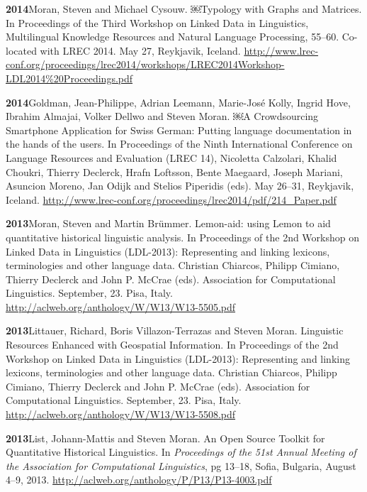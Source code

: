 \documentclass[11pt]{article}
\newcommand{\hangpara}{
 \setlength{\parindent}{0in} %
 \hangindent=0.42in %
}
\begin{document}
\vskip 6pt
\hangpara
{\bf 2014}\hspace{1ex}Moran, Steven and Michael Cysouw. ￼Typology with Graphs and Matrices. In Proceedings of the Third Workshop on Linked Data in Linguistics, Multilingual Knowledge Resources and Natural Language Processing, 55--60. Co-located with LREC 2014. May 27, Reykjavik, Iceland. \url{http://www.lrec-conf.org/proceedings/lrec2014/workshops/LREC2014Workshop-LDL2014\%20Proceedings.pdf}

\vskip 6pt
\hangpara
{\bf 2014}\hspace{1ex}Goldman, Jean-Philippe, Adrian Leemann, Marie-Jos{\'e} Kolly, Ingrid Hove, Ibrahim Almajai, Volker Dellwo and Steven Moran. ￼A Crowdsourcing Smartphone Application for Swiss German: Putting language documentation in the hands of the users. In Proceedings of the Ninth International Conference on Language Resources and Evaluation (LREC 14), Nicoletta Calzolari, Khalid Choukri, Thierry Declerck, Hrafn Loftsson, Bente Maegaard, Joseph Mariani, Asuncion Moreno, Jan Odijk and Stelios Piperidis (eds). May 26--31, Reykjavik, Iceland. \url{http://www.lrec-conf.org/proceedings/lrec2014/pdf/214_Paper.pdf}

\vskip 6pt
\hangpara
{\bf 2013}\hspace{1ex}Moran, Steven and Martin Br{\"u}mmer. Lemon-aid: using Lemon to aid quantitative historical linguistic analysis. In Proceedings of the 2nd Workshop on Linked Data in Linguistics (LDL-2013): Representing and linking lexicons, terminologies and other language data. Christian Chiarcos, Philipp Cimiano, Thierry Declerck and John P. McCrae (eds). Association for Computational Linguistics. September, 23. Pisa, Italy. \url{http://aclweb.org/anthology/W/W13/W13-5505.pdf}

\vskip 6pt
\hangpara
{\bf 2013}\hspace{1ex}Littauer, Richard, Boris Villazon-Terrazas and Steven Moran. Linguistic Resources Enhanced with Geospatial Information. In Proceedings of the 2nd Workshop on Linked Data in Linguistics (LDL-2013): Representing and linking lexicons, terminologies and other language data. Christian Chiarcos, Philipp Cimiano, Thierry Declerck and John P. McCrae (eds). Association for Computational Linguistics. September, 23. Pisa, Italy. \url{http://aclweb.org/anthology/W/W13/W13-5508.pdf}

\vskip 6pt
\hangpara
{\bf 2013}\hspace{1ex}List, Johann-Mattis and Steven Moran. An Open Source Toolkit for Quantitative Historical Linguistics. In {\it Proceedings of the 51st Annual Meeting of the Association for Computational Linguistics}, pg 13--18, Sofia, Bulgaria, August 4--9, 2013. \url{http://aclweb.org/anthology/P/P13/P13-4003.pdf}
\end{document}
